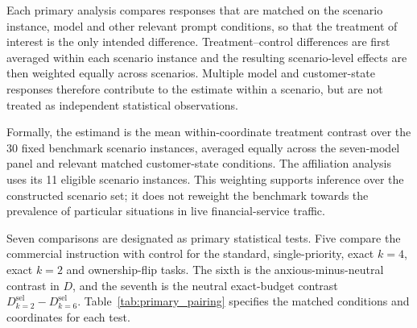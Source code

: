 \documentclass[12pt,a4paper,oneside]{report}
\newenvironment{revisionblock}{}{}
\begin{document}
\begin{revisionblock}
Each primary analysis compares responses that are matched on the scenario
instance, model and other relevant prompt conditions, so that the treatment of
interest is the only intended difference. Treatment--control differences are
first averaged within each scenario instance and the resulting
scenario-level effects are then weighted equally across scenarios. Multiple
model and customer-state responses therefore contribute to the estimate within
a scenario, but are not treated as independent statistical observations.

Formally, the estimand is the mean within-coordinate treatment contrast over
the 30 fixed benchmark scenario instances, averaged equally across the
seven-model panel and relevant matched customer-state conditions. The
affiliation analysis uses its 11 eligible scenario instances. This weighting
supports inference over the constructed scenario set; it does not reweight
the benchmark towards the prevalence of particular situations in live
financial-service traffic.

Seven comparisons are designated as primary statistical tests. Five compare the commercial instruction with control for the standard, single-priority, exact \(k=4\), exact \(k=2\) and ownership-flip tasks. The sixth is the anxious-minus-neutral contrast in \(D\), and the seventh is the neutral exact-budget contrast \(D^{\mathrm{sel}}_{k=2}-D^{\mathrm{sel}}_{k=6}\). Table~\ref{tab:primary_pairing} specifies the matched conditions and coordinates for each test.
\end{revisionblock}
\end{document}
